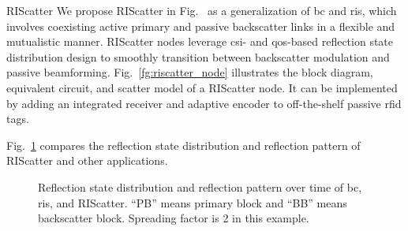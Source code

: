 \documentclass[journal,12pt,onecolumn,draftclsnofoot]{IEEEtran}
\theoremstyle{remark}
\begin{document}
\begin{section}{RIScatter}
	We propose RIScatter in Fig.~ as a generalization of \gls{bc} and \gls{ris}, which involves coexisting active primary and passive backscatter links in a flexible and mutualistic manner.
	RIScatter nodes leverage \gls{csi}- and \gls{qos}-based reflection state distribution design to smoothly transition between backscatter modulation and passive beamforming.
	Fig.~\ref{fg:riscatter_node} illustrates the block diagram, equivalent circuit, and scatter model of a RIScatter node.
	It can be implemented by adding an integrated receiver \cite{Kim2021a} and adaptive encoder \cite{He2020e} to off-the-shelf passive \gls{rfid} tags.
	\begin{figure*}[!t]
		\centering
		\caption{
		Block diagram, equivalent circuit, and scatter model of a RIScatter node.
		The solid and dashed vectors represent signal and energy flows.
		The scatter antenna behaves as a constant power source, where the voltage $V_0$ and current $I_0$ are introduced by incident electric field $\vec{E}_{\text{I}}$ and magnetic field $\vec{H}_{\text{I}}$ \cite{Huang2021}.
		}
		\label{fg:riscatter_node}
	\end{figure*}
	Fig.~\ref{fg:scatter_comparison} compares the reflection state distribution and reflection pattern of RIScatter and other applications.
	\begin{figure}[!t]
		\centering
		\caption{
			Reflection state distribution and reflection pattern over time of \gls{bc}, \gls{ris}, and RIScatter.
			``PB'' means primary block and ``BB'' means backscatter block.
			Spreading factor is 2 in this example.
		}
		\label{fg:scatter_comparison}
	\end{figure}

\end{section}
\end{document}
